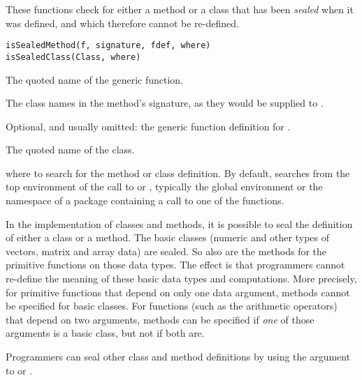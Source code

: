 %
\begin{Description}\relax
These functions check for either a method or a class that has been
\emph{sealed} when it was defined, and which therefore cannot be
re-defined.
\end{Description}
%
\begin{Usage}
\begin{verbatim}
isSealedMethod(f, signature, fdef, where)
isSealedClass(Class, where)
\end{verbatim}
\end{Usage}
%
\begin{Arguments}
\begin{ldescription}
\item[\code{f}]  The quoted name of the generic function. 
\item[\code{signature}]  The class names in the method's signature, as
they would be supplied to . 
\item[\code{fdef}]  Optional, and usually omitted:  the generic function
definition for . 
\item[\code{Class}] The quoted name of the class.

\item[\code{where}] where to search for the method or class definition.  By
default, searches from the top environment of the call to
 or , typically the
global environment or the namespace of a package containing a call
to one of the functions.
\end{ldescription}
\end{Arguments}
%
\begin{Details}\relax
In the \R{} implementation of classes and methods, it is possible to
seal the definition of either a class or a method.  The basic
classes (numeric and other types of vectors, matrix and array data)
are sealed.  So also are the methods for the primitive functions on
those data types.  The effect is that programmers cannot re-define
the meaning of these basic data types and computations.  More
precisely, for primitive functions that depend on only one data
argument, methods cannot be specified for basic classes.  For
functions (such as the arithmetic operators) that depend on two
arguments, methods can be specified if \emph{one} of those arguments
is a basic class, but not if both are.

Programmers can seal other class and method definitions by using the
 argument to  or .
\end{Details}
